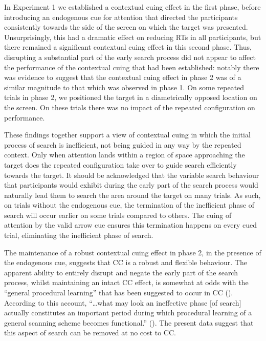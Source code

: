 \documentclass[
  man,
  floatsintext,
  longtable,
  nolmodern,
  notxfonts,
  notimes,
  colorlinks=true,linkcolor=blue,citecolor=blue,urlcolor=blue]{apa7}
\begin{document}
In Experiment 1 we established a contextual cuing effect in the first
phase, before introducing an endogenous cue for attention that directed
the participants consistently towards the side of the screen on which
the target was presented. Unsurprisingly, this had a dramatic effect on
reducing RTs in all participants, but there remained a significant
contextual cuing effect in this second phase. Thus, disrupting a
substantial part of the early search process did not appear to affect
the performance of the contextual cuing that had been established:
notably there was evidence to suggest that the contextual cuing effect
in phase 2 was of a similar magnitude to that which was observed in
phase 1. On some repeated trials in phase 2, we positioned the target in
a diametrically opposed location on the screen. On these trials there
was no impact of the repeated configuration on performance.

These findings together support a view of contextual cuing in which the
initial process of search is inefficient, not being guided in any way by
the repeated context. Only when attention lands within a region of space
approaching the target does the repeated configuration take over to
guide search efficiently towards the target. It should be acknowledged
that the variable search behaviour that participants would exhibit
during the early part of the search process would naturally lead them to
search the area around the target on many trials. As such, on trials
without the endogenous cue, the termination of the inefficient phase of
search will occur earlier on some trials compared to others. The cuing
of attention by the valid arrow cue ensures this termination happens on
every cued trial, eliminating the inefficient phase of search.

The maintenance of a robust contextual cuing effect in phase 2, in the
presence of the endogenous cue, suggests that CC is a robust and
flexible behaviour. The apparent ability to entirely disrupt and negate
the early part of the search process, whilst maintaining an intact CC
effect, is somewhat at odds with the ``general procedural learning''
that has been suggested to occur in CC (). According to this account, ``\ldots what may look an
ineffective phase {[}of search{]} actually constitutes an important
period during which procedural learning of a general scanning scheme
becomes functional.'' (). The present data suggest that this aspect of search can be removed
at no cost to CC.
\end{document}
